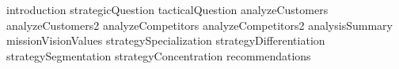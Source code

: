 \documentclass{beamer}
\begin{document}

\begin{frame}
  \titlepage
\end{frame}

{introduction}
{strategicQuestion}
{tacticalQuestion}
{analyzeCustomers}
{analyzeCustomers2}
{analyzeCompetitors}
{analyzeCompetitors2}
{analysisSummary}
{missionVisionValues}
{strategySpecialization}
{strategyDifferentiation}
{strategySegmentation}
{strategyConcentration}
{recommendations}




\begin{frame}[allowframebreaks]

\printbibliography

\end{frame}


\appendix
\end{document}
